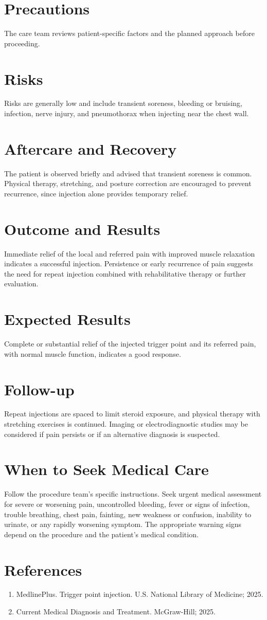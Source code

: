 \section*{Precautions}
The care team reviews patient-specific factors and the planned approach before proceeding.

\section*{Risks}
Risks are generally low and include transient soreness, bleeding or bruising, infection, nerve injury, and pneumothorax when injecting near the chest wall.

\section*{Aftercare and Recovery}
The patient is observed briefly and advised that transient soreness is common. Physical therapy, stretching, and posture correction are encouraged to prevent recurrence, since injection alone provides temporary relief.

\section*{Outcome and Results}
Immediate relief of the local and referred pain with improved muscle relaxation indicates a successful injection. Persistence or early recurrence of pain suggests the need for repeat injection combined with rehabilitative therapy or further evaluation.

\section*{Expected Results}
Complete or substantial relief of the injected trigger point and its referred pain, with normal muscle function, indicates a good response.

\section*{Follow-up}
Repeat injections are spaced to limit steroid exposure, and physical therapy with stretching exercises is continued. Imaging or electrodiagnostic studies may be considered if pain persists or if an alternative diagnosis is suspected.

\section*{When to Seek Medical Care}
Follow the procedure team's specific instructions. Seek urgent medical assessment for severe or worsening pain, uncontrolled bleeding, fever or signs of infection, trouble breathing, chest pain, fainting, new weakness or confusion, inability to urinate, or any rapidly worsening symptom. The appropriate warning signs depend on the procedure and the patient's medical condition.

\section*{References}
\begin{enumerate}
  \item MedlinePlus. Trigger point injection. U.S. National Library of Medicine; 2025.
  \item Current Medical Diagnosis and Treatment. McGraw-Hill; 2025.
\end{enumerate}

\clearpage
